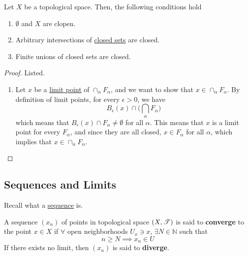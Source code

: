   \begin{theorem}
    \label{thm:topological-space-wrt-closed-sets}
    Let $X$ be a topological space. Then, the following conditions hold
    \begin{enumerate}
      \item $\emptyset$ and $X$ are clopen.
      \item Arbitrary intersections of \hyperref[def:closed]{closed sets} are closed. 
      \item Finite unions of closed sets are closed. 
    \end{enumerate}
  \end{theorem}
  \begin{proof}
    Listed. 
    \begin{enumerate}
      \item Let $x$ be a \hyperref[def:limit-point]{limit point} of $\cap_\alpha F_\alpha$, and we want to show that $x \in \cap_\alpha F_\alpha$. By definition of limit points, for every $\epsilon > 0$, we have 
      \begin{equation}
        B_\epsilon (x) \cap \bigg( \bigcap_\alpha F_\alpha \bigg)
      \end{equation}
      which means that $B_\epsilon (x) \cap F_\alpha \neq \emptyset$ for all $\alpha$. This means that $x$ is a limit point for every $F_\alpha$, and since they are all closed, $x \in F_\alpha$ for all $\alpha$, which implies that $x \in \cap_\alpha F_\alpha$. 
    \end{enumerate}
  \end{proof}

\subsection{Sequences and Limits} 

  Recall what a \hyperref[st-def:sequence]{sequence} is. 

  \begin{definition}
    \label{def:sequence}
    A sequence $(x_n)$ of points in topological space $(X, \operatorname{\mathscr{T}})$ is said to \textbf{converge} to the point $x \in X$ if $\forall$ open neighborhoods $U_x \ni x$, $\exists N \in \mathbb{N}$ such that
    \begin{equation}
      n \geq N \implies x_n \in U 
    \end{equation}
    If there exists no limit, then $(x_n)$ is said to \textbf{diverge}. 
  \end{definition}

